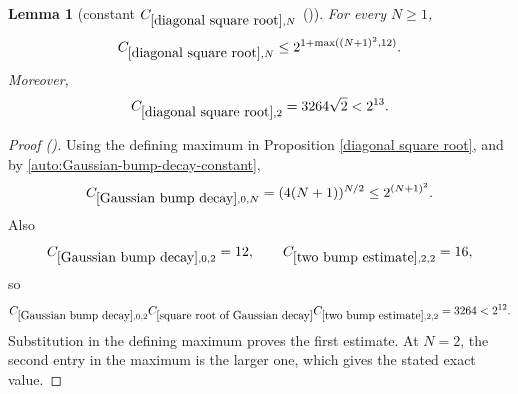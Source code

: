 \documentclass[12pt,reqno]{amsart}
\newcommand{\auto}{{({\tiny\faCar})}}
\theoremstyle{plain}
\newtheorem{lemma}[theorem]{Lemma}
\numberwithin{equation}{section}
\theoremstyle{remark}
\newcommand{\uses}[1]{}
\newcommand{\usesdefs}[1]{}
\begin{document}
\begin{lemma}[constant $C_{\ref{diagonal square root},N}$ \auto]\label{constant diagonal square root}\uses{Gaussian bump decay,two bump estimate,square root of Gaussian decay,diagonal square root}\usesdefs{}
For every $N\ge1$,
\begin{equation}\label{constant diagonal square root bound}
C_{\ref{diagonal square root},N}
\le2^{1+\max((N+1)^2,12)}.
\end{equation}
Moreover,
\begin{equation}\label{auto:constant-diagonal-square-root-two}
C_{\ref{diagonal square root},2}=3264\sqrt2<2^{13}.
\end{equation}
\end{lemma}
\begin{proof}[Proof \auto]
Using the defining maximum in Proposition \ref{diagonal square root}, and by \eqref{auto:Gaussian-bump-decay-constant},
\[
C_{\ref{Gaussian bump decay},0,N}
=(4(N+1))^{N/2}
\le2^{(N+1)^2}.
\]
Also
\[
C_{\ref{Gaussian bump decay},0,2}=12,
\qquad
C_{\ref{two bump estimate},2,2}=16,
\]
so
\[
C_{\ref{Gaussian bump decay},0,2}
C_{\ref{square root of Gaussian decay}}
C_{\ref{two bump estimate},2,2}
=3264<2^{12}.
\]
Substitution in the defining maximum proves the first estimate. At $N=2$, the second entry in the maximum is the larger one, which gives the stated exact value.
\end{proof}
\end{document}

